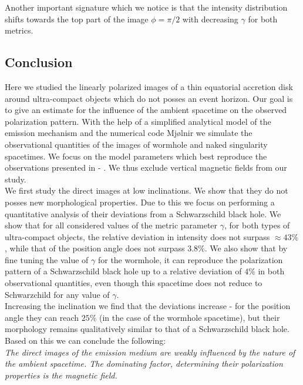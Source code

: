 \documentclass[12pt]{article}
\numberwithin{equation}{section}
\numberwithin{figure}{section}
\begin{document}
	Another important signature which we notice is that the intensity distribution shifts towards the top part of the image $\phi = \pi / 2$ with decreasing $\gamma$ for both metrics.
	
	\newpage
	
	\subsection{Conclusion}
	
	Here we studied the linearly polarized images of a thin equatorial accretion disk around ultra-compact objects which do not posses an event horizon. Our goal is to give an estimate for the influence of the ambient spacetime on the observed polarization pattern. With the help of a simplified analytical model of the emission mechanism and the numerical code Mjølnir we simulate the observational quantities of the images of wormhole and naked singularity spacetimes. We focus on the model parameters which best reproduce the observations presented in \cite{EHT_M87_I} - \cite{EHT_M87_VIII}. We thus exclude vertical magnetic fields from our study.\\
	
	We first study the direct images at low inclinations. We show that they do not posses new morphological properties. Due to this we focus on performing a quantitative analysis of their deviations from a Schwarzschild black hole. We show that for all considered values of the metric parameter $\gamma$, for both types of ultra-compact objects, the relative deviation in intensity does not surpass $\approx 43\%$, while that of the position angle does not surpass $3.8\%$. We also show that by fine tuning the value of $\gamma$ for the wormhole, it can reproduce the polarization pattern of a Schwarzschild black hole up to a relative deviation of $4\%$ in both observational quantities, even though this spacetime does not reduce to Schwarzchild for any value of $\gamma$.\\
	
	Increasing the inclination we find that the deviations increase - for the position angle they can reach $25\%$ (in the case of the wormhole spacetime), but their morphology remains qualitatively similar to that of a Schwarzschild black hole. Based on this we can conclude the following:\\
	
	\emph{The direct images of the emission medium are weakly influenced by the nature of the ambient spacetime. The dominating factor, determining their polarization properties is the magnetic field.}\\
	
\end{document}
